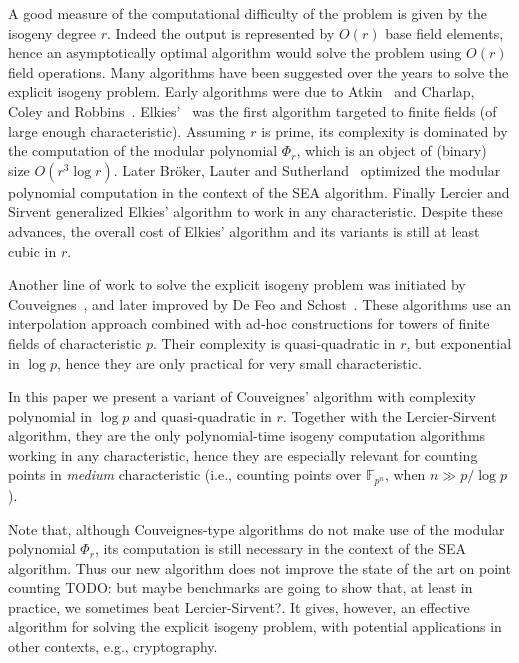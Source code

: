 \documentclass{lms}
\newcommand{\todo}[1]{{\color{red}TODO: #1}}
\newcommand{\F}{\mathbb{F}}
\begin{document}
A good measure of the computational difficulty of the problem is given
by the isogeny degree $r$. Indeed the output is represented by
$O(r)$ base field elements, hence an asymptotically optimal algorithm
would solve the problem using $O(r)$ field operations. Many algorithms
have been suggested over the years to solve the explicit isogeny
problem. Early algorithms were due to Atkin~\cite{atkin91} and
Charlap, Coley and
Robbins~\cite{charlap1991enumeration}. Elkies'~\cite{elkies92,elkies98,Bostan}
was the first algorithm targeted to finite fields (of large enough
characteristic). Assuming $r$ is prime, its complexity is dominated by
the computation of the modular polynomial $\Phi_r$, which is an object
of (binary) size $O(r^3\log r)$. Later Bröker, Lauter and
Sutherland~\cite{sutherland10:modpol} optimized the modular polynomial
computation in the context of the SEA
algorithm. Finally Lercier and Sirvent\cite{lercier+sirvent08,1602.00244}
generalized Elkies' algorithm to work in any characteristic. Despite
these advances, the overall cost of Elkies' algorithm and its
variants is still at least cubic in $r$.

Another line of work to solve the explicit isogeny problem was
initiated by Couveignes~\cite{couveignes94,couveignes96,couveignes00},
and later improved by De Feo and Schost~\cite{df10,df+schost12}. These
algorithms use an interpolation approach combined with ad-hoc
constructions for towers of finite fields of characteristic $p$. Their
complexity is quasi-quadratic in $r$, but exponential in $\log p$,
hence they are only practical for very small characteristic.

In this paper we present a variant of Couveignes' algorithm with
complexity polynomial in $\log p$ and quasi-quadratic in $r$. Together
with the Lercier-Sirvent algorithm, they are the only polynomial-time
isogeny computation algorithms working in any characteristic, hence
they are especially relevant for counting points in \emph{medium}
characteristic (i.e., counting points over $\F_{p^n}$, when
$n\gg p/\log p$).

Note that, although Couveignes-type algorithms do not make use of the
modular polynomial $\Phi_r$, its computation is still necessary in the
context of the SEA algorithm. Thus our new algorithm does not improve
the state of the art on point counting \todo{but maybe benchmarks are
  going to show that, at least in practice, we sometimes beat
  Lercier-Sirvent?}. It gives, however, an effective algorithm for
solving the explicit isogeny problem, with potential applications in
other contexts, e.g., cryptography.
\end{document}
